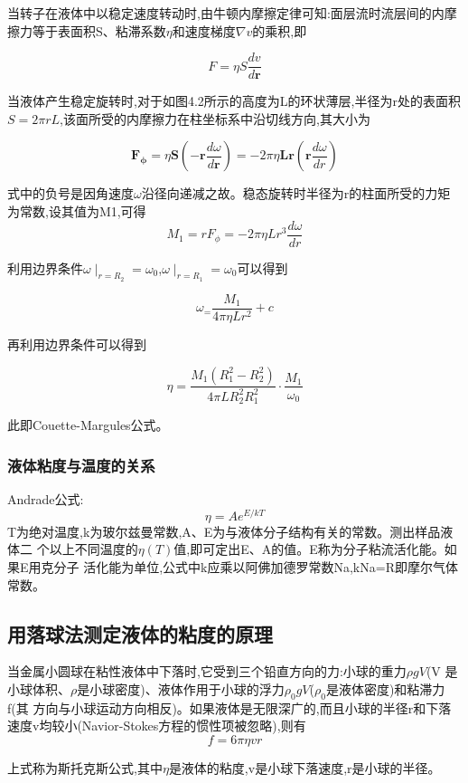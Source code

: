 \documentclass[12pt,a4paper]{ctexart}
\begin{document}
当转子在液体中以稳定速度转动时,由牛顿内摩擦定律可知:面层流时流层间的内摩擦力等于表面积S、粘滞系数$\eta$和速度梯度\(\nabla v\)的乘积,即

\[F=\eta S\frac{dv}{d\mathbf{r}}\]

当液体产生稳定旋转时,对于如图4.2所示的高度为L的环状薄层,半径为r处的表面积\(S=2\pi rL\),该面所受的内摩擦力在柱坐标系中沿切线方向,其大小为

\[\mathbf{F_\phi}=\eta\mathbf{S}(-\mathbf{r}\frac{d \omega}{d\mathbf{r}})=-2\pi\eta\mathbf{Lr}(\mathbf{r}\frac{d \omega}{d r})\]

式中的负号是因角速度\(\omega\)沿径向递减之故。稳态旋转时半径为r的柱面所受的力矩为常数,设其值为M1,可得
\[M_1=rF_\phi=-2\pi\eta Lr^3\frac{d\omega}{d r}\]

利用边界条件\(\omega \mid_{r=R_2}=\omega_0\),\(\omega \mid_{r=R_1}=\omega_0\)可以得到

\[\omega_=\frac{M_1}{4\pi\eta L r^2}+c\]

再利用边界条件可以得到

\[\eta=\frac{M_1(R_1^2-R_2^2)}{4\pi LR_2^2R_1^2}\cdot\frac{M_1}{\omega_0}\]

此即Couette-Margules公式。

\subsubsection{液体粘度与温度的关系}

Andrade公式:
$$\eta=Ae^{E/kT}$$
T为绝对温度,k为玻尔兹曼常数,A、E为与液体分子结构有关的常数。测出样品液体二
个以上不同温度的\(\eta(T)\)值,即可定出E、A的值。E称为分子粘流活化能。如果E用克分子
活化能为单位,公式中k应乘以阿佛加德罗常数Na,kNa=R即摩尔气体常数。

\subsection{用落球法测定液体的粘度的原理}

当金属小圆球在粘性液体中下落时,它受到三个铅直方向的力:小球的重力\(\rho gV\)(V
是小球体积、\(\rho\)是小球密度)、液体作用于小球的浮力\(\rho_0gV\)(\(\rho_0\)是液体密度)和粘滞力f(其
方向与小球运动方向相反)。如果液体是无限深广的,而且小球的半径r和下落速度v均较小(Navior-Stokes方程的惯性项被忽略),则有
\begin{equation}
f = 6\pi\eta vr
\label{s}
\end{equation}

上式称为斯托克斯公式,其中$\eta$是液体的粘度,v是小球下落速度,r是小球的半径。
\end{document}
